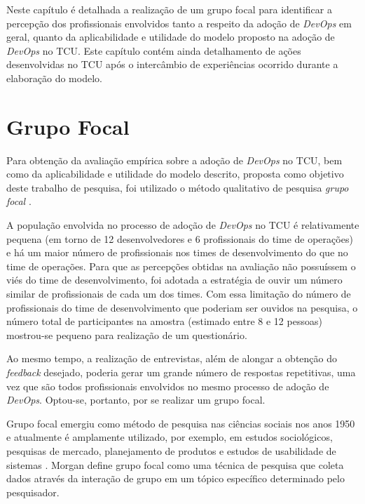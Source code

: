 Neste capítulo é detalhada a realização de um grupo focal \cite{focus_group_handbook,shull2007guide}
para identificar a percepção dos profissionais envolvidos tanto a respeito da
adoção de {\it DevOps} em geral, quanto da aplicabilidade e utilidade do modelo
proposto na adoção de {\it DevOps} no \acrshort{TCU}. Este capítulo contém ainda
detalhamento de ações desenvolvidas no \acrshort{TCU} após o intercâmbio de
experiências ocorrido durante a elaboração do modelo.

\section{Grupo Focal}

Para obtenção da avaliação empírica sobre a adoção de {\it DevOps} no \acrshort{TCU},
bem como da aplicabilidade e utilidade do modelo descrito, proposta como
objetivo deste trabalho de pesquisa, foi utilizado o método qualitativo de
pesquisa \emph{grupo focal} \cite{focus_group_handbook}.

A população envolvida no processo de adoção de \textit{DevOps} no TCU é
relativamente pequena (em torno de 12 desenvolvedores e 6 profissionais do time
de operações) e há um maior número de profissionais nos times de
desenvolvimento do que no time de operações. Para que as percepções obtidas
na avaliação não possuíssem o viés do time de desenvolvimento, foi adotada a
estratégia de ouvir um número similar de profissionais de cada um dos times.
Com essa limitação do número de profissionais do time de desenvolvimento que
poderiam ser ouvidos na pesquisa, o número total de participantes na amostra
(estimado entre 8 e 12 pessoas) mostrou-se pequeno para realização de um
questionário.

Ao mesmo tempo, a realização de entrevistas, além de alongar a obtenção do
\textit{feedback} desejado, poderia gerar um grande número de respostas
repetitivas, uma vez que são todos profissionais envolvidos no mesmo processo
de adoção de \textit{DevOps}. Optou-se, portanto, por se realizar um grupo
focal.

Grupo focal emergiu como método de pesquisa nas ciências sociais nos anos 1950
e atualmente é amplamente utilizado, por exemplo, em estudos sociológicos,
pesquisas de mercado, planejamento de produtos e estudos de usabilidade de
sistemas \cite{shull2007guide}. Morgan \cite{morgan1996focus} define grupo focal
como uma técnica de pesquisa que coleta dados através da interação de grupo em
um tópico específico determinado pelo pesquisador.

